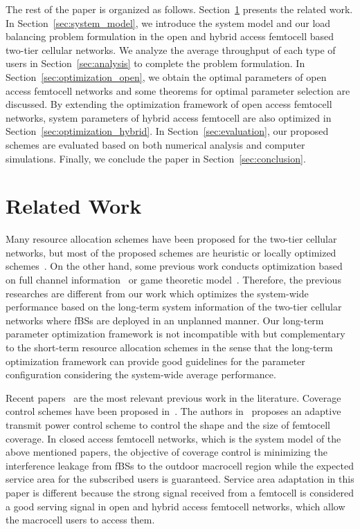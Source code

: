 \documentclass[journal]{IEEEtran}
\begin{document}
The rest of the paper is organized as follows. Section~\ref{sec:related} presents the related work. In Section~\ref{sec:system_model}, we introduce the system model and our load balancing
problem formulation in the open and hybrid access femtocell based two-tier cellular networks.
We analyze the average throughput of each type of users in Section~\ref{sec:analysis} to complete the problem formulation.
In Section~\ref{sec:optimization_open}, we obtain the optimal
parameters of open access femtocell networks and
some theorems for optimal parameter selection are discussed. By extending the
optimization framework of open access femtocell networks,
system parameters of hybrid access femtocell are also optimized
in Section~\ref{sec:optimization_hybrid}.
In Section~\ref{sec:evaluation}, our proposed schemes are evaluated based on both numerical analysis and computer simulations.
Finally, we conclude the paper in Section~\ref{sec:conclusion}.


\section{Related Work}
\label{sec:related}

Many resource allocation schemes have been proposed for the two-tier cellular networks, but most of the proposed schemes are heuristic or locally optimized schemes~\cite{coml08guvenc,globecom08choi,icc09claussen,mobihoc09sundaresan,
globecom09bai,twc10jo,icc11kaimaletu,icc11park,mobicom11arslan,icc11hatoum}.
On the other hand, some previous work conducts optimization based on
full channel information~\cite{wiopt09han,pimrc09kim,twc11cheng} or game theoretic model~\cite{pimrc10bennis,icc11lin,icc11bennis,tvt11ko}.
Therefore, the previous researches are different from our work which optimizes
the system-wide performance based on the long-term system information
of the two-tier cellular networks where fBSs are deployed in an unplanned manner.
Our long-term parameter optimization framework is not incompatible with but complementary to
the short-term resource allocation schemes
in the sense that the long-term optimization framework can provide good guidelines
for the parameter configuration considering the system-wide average performance.

Recent papers~\cite{twc10jo,tcom09chandrasekhar} are the most relevant previous work in the literature.
Coverage control schemes have been proposed in~\cite{twc09Chandrasekhar_coverage,twc10jo}.
The authors in~\cite{twc10jo} proposes an adaptive transmit power control scheme to control
the shape and the size of femtocell coverage.
In closed access femtocell networks, which is the system model of the above mentioned papers,
the objective of coverage control is minimizing the interference leakage from fBSs to the outdoor macrocell region
while the expected service area for the subscribed users is guaranteed.
Service area adaptation in this paper is different
because the strong signal received from a femtocell is
considered a good serving signal in open and
hybrid access femtocell networks, which allow the macrocell users to access them.
\end{document}
